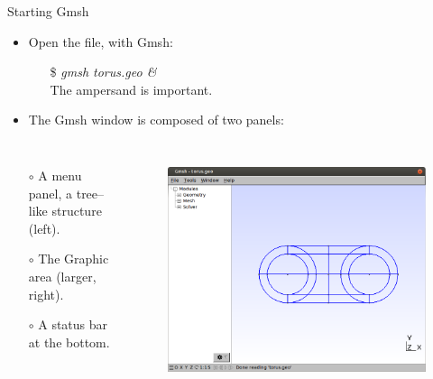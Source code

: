 \documentclass[t]{beamer}
\begin{document}
\begin{frame}{Starting Gmsh}
  \begin{itemize} 
     \item Open the file, with Gmsh:
     \begin{itemize} 
         \item[\$] \emph{gmsh torus.geo \&} \\ \hspace{10pt} The ampersand is important.
     \end{itemize} 
     \item The Gmsh window is composed of two panels:
  \end{itemize}
\vspace{-15pt}
\begin{columns}[l]
\column{2.3in}
  \begin{itemize} 
        \item[$\circ$] A menu panel, a tree--like structure (left).
        \item[$\circ$] The Graphic area (larger, right).
        \item[$\circ$] A status bar at the bottom.
  \end{itemize}
\column{2.2in}
\vspace{-5pt}
\begin{figure}[htbp!]
 \centering
  \includegraphics[width=1.0\textwidth]{../figures/torus_z_view}
  \label{fig:torus_z_view}
\end{figure}
\end{columns}
\end{frame}
\end{document}

